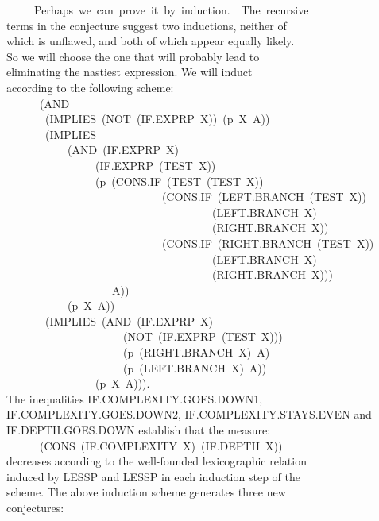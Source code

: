 \documentclass[10pt]{book}
\newenvironment{pubasis}{\begin{flushleft}}{\end{flushleft}}
\begin{document}
\begin{pubasis}
~~~~~Perhaps~we~can~prove~it~by~induction.~~The~recursive\\
terms in the conjecture suggest two inductions, neither of\\
which is unflawed, and both of which appear equally likely.\\
So we will choose the one that will probably lead to\\
eliminating the nastiest expression.  We will induct\\
according to the following scheme:\\
~~~~~~(AND\\
~~~~~~~(IMPLIES~(NOT~(IF.EXPRP~X))~(p~X~A))\\
~~~~~~~(IMPLIES\\
~~~~~~~~~~~(AND~(IF.EXPRP~X)\\
~~~~~~~~~~~~~~~~(IF.EXPRP~(TEST~X))\\
~~~~~~~~~~~~~~~~(p~(CONS.IF~(TEST~(TEST~X))\\
~~~~~~~~~~~~~~~~~~~~~~~~~~~~(CONS.IF~(LEFT.BRANCH~(TEST~X))\\
~~~~~~~~~~~~~~~~~~~~~~~~~~~~~~~~~~~~~(LEFT.BRANCH~X)\\
~~~~~~~~~~~~~~~~~~~~~~~~~~~~~~~~~~~~~(RIGHT.BRANCH~X))\\
~~~~~~~~~~~~~~~~~~~~~~~~~~~~(CONS.IF~(RIGHT.BRANCH~(TEST~X))\\
~~~~~~~~~~~~~~~~~~~~~~~~~~~~~~~~~~~~~(LEFT.BRANCH~X)\\
~~~~~~~~~~~~~~~~~~~~~~~~~~~~~~~~~~~~~(RIGHT.BRANCH~X)))\\
~~~~~~~~~~~~~~~~~~~A))\\
~~~~~~~~~~~(p~X~A))\\
~~~~~~~(IMPLIES~(AND~(IF.EXPRP~X)\\
~~~~~~~~~~~~~~~~~~~~~(NOT~(IF.EXPRP~(TEST~X)))\\
~~~~~~~~~~~~~~~~~~~~~(p~(RIGHT.BRANCH~X)~A)\\
~~~~~~~~~~~~~~~~~~~~~(p~(LEFT.BRANCH~X)~A))\\
~~~~~~~~~~~~~~~~(p~X~A))).\\
The inequalities IF.COMPLEXITY.GOES.DOWN1,\\
IF.COMPLEXITY.GOES.DOWN2, IF.COMPLEXITY.STAYS.EVEN and\\
IF.DEPTH.GOES.DOWN establish that the measure:\\
~~~~~~(CONS~(IF.COMPLEXITY~X)~(IF.DEPTH~X))\\
decreases according to the well-founded lexicographic relation\\
induced by LESSP and LESSP in each induction step of the\\
scheme.  The above induction scheme generates three new\\
conjectures:\\


\end{pubasis}
\end{document}
